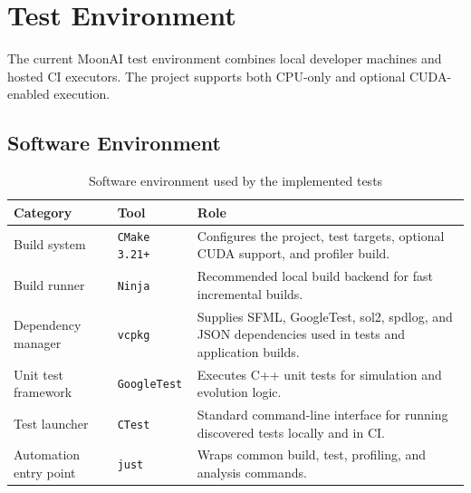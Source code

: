 \section{Test Environment}
\label{sec:environment}

The current MoonAI test environment combines local developer machines and hosted CI
executors. The project supports both CPU-only and optional CUDA-enabled execution.

\subsection{Software Environment}

\begin{table}[H]
	\centering
	\caption{Software environment used by the implemented tests}
	\label{tab:software-env}
	\begin{tabularx}{\textwidth}{@{}>{\ttfamily\small}l>{\ttfamily\small}lX@{}}
		\toprule
		\textbf{Category}      & \textbf{Tool}                                          & \textbf{Role}                                                                                        \\
		\midrule
		Build system           & \texttt{CMake 3.21+}                                   & Configures the project, test targets, optional CUDA support, and profiler build.                     \\
		Build runner           & \texttt{Ninja}                                         & Recommended local build backend for fast incremental builds.                                         \\
		Dependency manager     & \texttt{vcpkg}                                         & Supplies SFML, GoogleTest, sol2, spdlog, and JSON dependencies used in tests and application builds. \\
		Unit test framework    & \texttt{GoogleTest}                                    & Executes C++ unit tests for simulation and evolution logic.                                          \\
		Test launcher          & \texttt{CTest}                                         & Standard command-line interface for running discovered tests locally and in CI.                      \\
		Automation entry point & \texttt{just}                                          & Wraps common build, test, profiling, and analysis commands.                                          \\

\end{tabularx}
\end{table}

